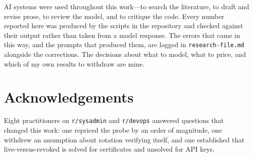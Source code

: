 \documentclass{article}
\begin{document}
AI systems were used throughout this work---to search the literature, to draft
and revise prose, to review the model, and to critique the code. Every number
reported here was produced by the scripts in the repository and checked against
their output rather than taken from a model response. The errors that came in
this way, and the prompts that produced them, are logged in
\texttt{research-file.md} alongside the corrections. The decisions about what to
model, what to price, and which of my own results to withdraw are mine.

\section*{Acknowledgements}

Eight practitioners on \texttt{r/sysadmin} and \texttt{r/devops} answered
questions that changed this work: one repriced the probe by an order of
magnitude, one withdrew an assumption about rotation verifying itself, and one
established that live-versus-revoked is solved for certificates and unsolved for
API keys.



\end{document}
